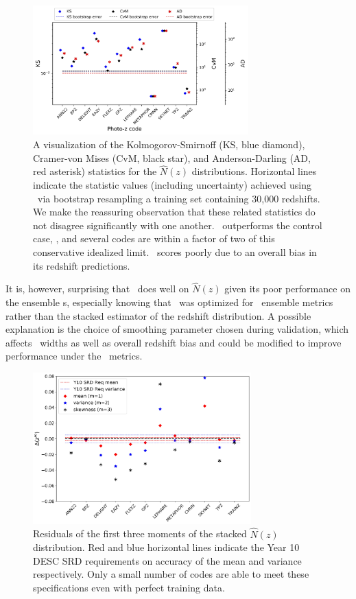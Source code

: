 \begin{figure}
\centering
\includegraphics[width=0.74\textwidth]{fig/KSvsCvMvsAD_NZ_withnull_jpg.jpg}
\caption{A visualization of the Kolmogorov-Smirnoff (KS, blue diamond), Cramer-von Mises (CvM, black star), and Anderson-Darling (AD, red asterisk) statistics for the $\hat{N}(z)$ distributions.
Horizontal lines indicate the statistic values (including uncertainty) achieved using \trainz\ via bootstrap resampling a training set containing 30,000 redshifts.
We make the reassuring observation that these related statistics do not disagree significantly with one another.
\cmnn\ outperforms the control case, \trainz, and several codes are within a factor of two of this conservative idealized limit.
\skynet\ scores poorly due to an overall bias in its redshift predictions.}
\label{fig:nz_stats}
\end{figure}

It is, however, surprising that \tpz\ does well on $\hat{N}(z)$ given its poor performance on the ensemble \pzpdf s, especially knowing that \tpz\ was optimized for \pzpdf\ ensemble metrics rather than the stacked estimator of the redshift distribution.
A possible explanation is the choice of smoothing parameter chosen during validation, which affects \pzpdf\ widths as well as overall redshift bias and could be modified to improve performance under the \pzpdf\ metrics.

\begin{figure}
\centering
\includegraphics[width=0.75\textwidth]{fig/momentsplot_10yr.jpg}
\caption{Residuals of the first three moments of the stacked $\hat{N}(z)$ distribution.  Red and blue horizontal lines indicate the Year 10 DESC SRD requirements on accuracy of the mean and variance respectively.  Only a small number of codes are able to meet these specifications even with perfect training data.   }
\label{fig:moments}
\end{figure}


